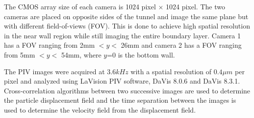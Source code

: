 The CMOS array size of each camera is 1024 pixel $\times$ 1024 pixel. The two cameras are placed on opposite sides of the tunnel and image the same plane but with different field-of-views (FOV). This is done to achieve high spatial resolution in the near wall region while still imaging the entire boundary layer. Camera 1 has a FOV ranging from 2mm $< y <$ 26mm and camera 2 has a FOV ranging from 5mm $< y <$ 54mm, where $y$=0 is the bottom wall. 

The PIV images were acquired at $3.6 kHz$ with a spatial resolution of $0.4\mu m$ per pixel and analyzed using LaVision PIV software, DaVis 8.0.6 and DaVis 8.3.1. Cross-correlation algorithms between two successive images are used to determine the particle displacement field and the time separation between the images is used to determine the velocity field from the displacement field.
 